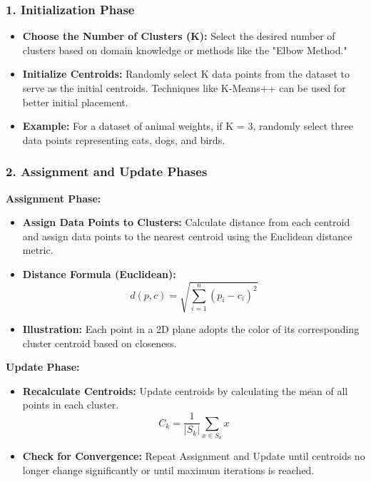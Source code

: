 \documentclass[aspectratio=169]{beamer}
\begin{document}
\begin{frame}[fragile]
    \frametitle{1. Initialization Phase}
    \begin{itemize}
        \item \textbf{Choose the Number of Clusters (K):} Select the desired number of clusters based on domain knowledge or methods like the "Elbow Method."
        
        \item \textbf{Initialize Centroids:} Randomly select K data points from the dataset to serve as the initial centroids. Techniques like K-Means++ can be used for better initial placement.
        
        \item \textbf{Example:} For a dataset of animal weights, if K = 3, randomly select three data points representing cats, dogs, and birds.
    \end{itemize}
\end{frame}

\begin{frame}[fragile]
    \frametitle{2. Assignment and Update Phases}
    \textbf{Assignment Phase:}
    \begin{itemize}
        \item \textbf{Assign Data Points to Clusters:} Calculate distance from each centroid and assign data points to the nearest centroid using the Euclidean distance metric.
        \item \textbf{Distance Formula (Euclidean):}
        \begin{equation}
            d(p, c) = \sqrt{\sum_{i=1}^{n} (p_i - c_i)^2}
        \end{equation}

        \item \textbf{Illustration:} Each point in a 2D plane adopts the color of its corresponding cluster centroid based on closeness.
    \end{itemize}
    
    \textbf{Update Phase:}
    \begin{itemize}
        \item \textbf{Recalculate Centroids:} Update centroids by calculating the mean of all points in each cluster.
        \begin{equation}
            C_k = \frac{1}{|S_k|}\sum_{x \in S_k} x
        \end{equation}
        
        \item \textbf{Check for Convergence:} Repeat Assignment and Update until centroids no longer change significantly or until maximum iterations is reached.
    \end{itemize}
\end{frame}
\end{document}
